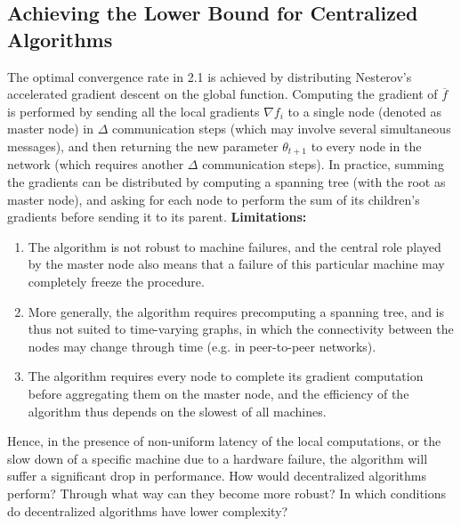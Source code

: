 \documentclass[12pt]{article}
\begin{document}
\subsection{Achieving the Lower Bound for Centralized Algorithms}
The optimal convergence rate in 2.1 is achieved by distributing Nesterov’s accelerated gradient descent on the global function. Computing the gradient of $\overline{f}$ is performed by sending all the local gradients $\nabla f_{i}$ to a single node (denoted as master node) in $\Delta$ communication steps (which may involve several simultaneous messages), and then returning the new parameter $\theta_{t+1}$ to every node in the network (which requires another $\Delta$ communication steps). In practice, summing the gradients can be distributed by computing a spanning tree (with the root as master node), and asking for each node to perform the sum of its children’s gradients before sending it to its parent. 
\newline
\newline
\textbf{Limitations: }
\begin{enumerate}
    \item The algorithm is not robust to machine failures, and the
central role played by the master node also means that a failure of this particular machine may
completely freeze the procedure. 
    \item More generally, the algorithm requires precomputing
a spanning tree, and is thus not suited to time-varying graphs, in which the connectivity between
the nodes may change through time (e.g. in peer-to-peer networks). 
    \item The algorithm requires every node to complete its gradient computation before aggregating them on the master node, and the efficiency of the algorithm thus depends on the slowest of all machines.
\end{enumerate}
Hence, in the presence of non-uniform latency of the local computations, or the slow down of a specific machine due to a hardware failure, the algorithm will suffer a significant drop in performance. 
\newline
\newline
How would decentralized algorithms perform? Through what way can they become more robust? In which conditions do decentralized algorithms have lower complexity? 
\end{document}
